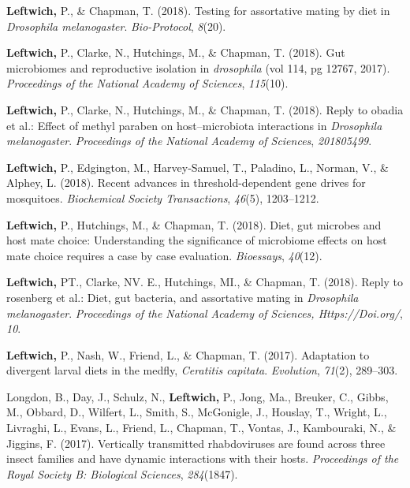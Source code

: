 \documentclass[11pt, a4paper]{awesome-cv}
\begin{document}
\leavevmode\hypertarget{ref-17}{}%
\textbf{Leftwich,} P., \& Chapman, T. (2018). Testing for assortative
mating by diet in \emph{{Drosophila} melanogaster}. \emph{Bio-Protocol},
\emph{8}(20).

\leavevmode\hypertarget{ref-3}{}%
\textbf{Leftwich,} P., Clarke, N., Hutchings, M., \& Chapman, T. (2018).
Gut microbiomes and reproductive isolation in \emph{drosophila} (vol
114, pg 12767, 2017). \emph{Proceedings of the National Academy of
Sciences}, \emph{115}(10).

\leavevmode\hypertarget{ref-10}{}%
\textbf{Leftwich,} P., Clarke, N., Hutchings, M., \& Chapman, T. (2018).
Reply to obadia et al.: Effect of methyl paraben on host--microbiota
interactions in \emph{{Drosophila} melanogaster}. \emph{Proceedings of
the National Academy of Sciences}, \emph{201805499}.

\leavevmode\hypertarget{ref-5}{}%
\textbf{Leftwich,} P., Edgington, M., Harvey-Samuel, T., Paladino, L.,
Norman, V., \& Alphey, L. (2018). Recent advances in threshold-dependent
gene drives for mosquitoes. \emph{Biochemical Society Transactions},
\emph{46}(5), 1203--1212.

\leavevmode\hypertarget{ref-12}{}%
\textbf{Leftwich,} P., Hutchings, M., \& Chapman, T. (2018). Diet, gut
microbes and host mate choice: Understanding the significance of
microbiome effects on host mate choice requires a case by case
evaluation. \emph{Bioessays}, \emph{40}(12).

\leavevmode\hypertarget{ref-8}{}%
\textbf{Leftwich,} PT., Clarke, NV. E., Hutchings, MI., \& Chapman, T.
(2018). Reply to rosenberg et al.: Diet, gut bacteria, and assortative
mating in \emph{{Drosophila} melanogaster}. \emph{Proceedings of the
National Academy of Sciences, Https://Doi.org/}, \emph{10}.

\leavevmode\hypertarget{ref-9}{}%
\textbf{Leftwich,} P., Nash, W., Friend, L., \& Chapman, T. (2017).
Adaptation to divergent larval diets in the medfly, \emph{{Ceratitis}
capitata}. \emph{Evolution}, \emph{71}(2), 289--303.

\leavevmode\hypertarget{ref-7}{}%
Longdon, B., Day, J., Schulz, N., \textbf{Leftwich,} P., Jong, Ma.,
Breuker, C., Gibbs, M., Obbard, D., Wilfert, L., Smith, S., McGonigle,
J., Houslay, T., Wright, L., Livraghi, L., Evans, L., Friend, L.,
Chapman, T., Vontas, J., Kambouraki, N., \& Jiggins, F. (2017).
Vertically transmitted rhabdoviruses are found across three insect
families and have dynamic interactions with their hosts.
\emph{Proceedings of the Royal Society B: Biological Sciences},
\emph{284}(1847).
\end{document}
